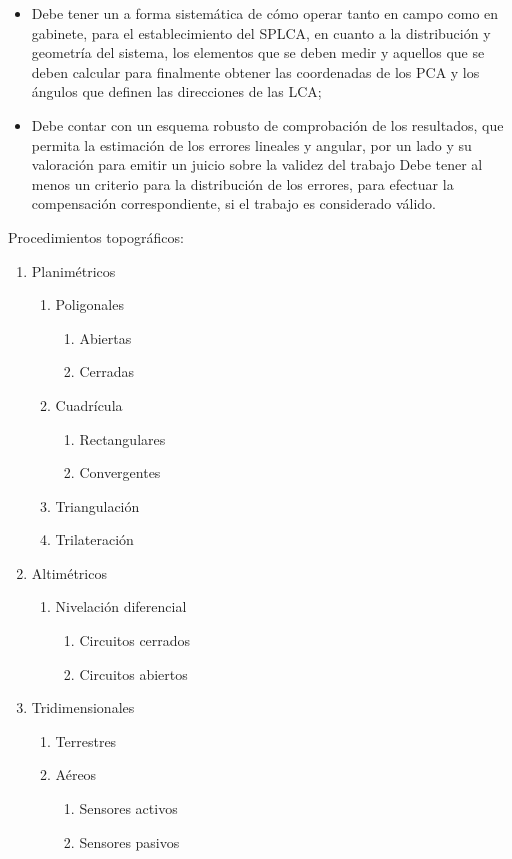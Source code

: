 \begin{itemize}
    \item Debe tener un a forma sistemática de cómo operar tanto en campo como en gabinete, para el establecimiento del SPLCA, en cuanto a la distribución y geometría del sistema, los elementos que se deben medir y aquellos que se deben calcular para finalmente obtener las coordenadas de los PCA y los ángulos que definen las direcciones de las LCA; 
    \item Debe contar con un esquema robusto de comprobación de los resultados, que permita la estimación de los errores lineales y angular, por un lado y su valoración para emitir un juicio sobre la validez del trabajo
    Debe tener al menos un criterio para la distribución de los errores, para efectuar la compensación correspondiente, si el trabajo es considerado válido.
\end{itemize}

Procedimientos topográficos: 

\begin{enumerate}
    \item Planimétricos
    \begin{enumerate}
        \item Poligonales
        \begin{enumerate}
            \item Abiertas
            \item Cerradas
        \end{enumerate}
        \item Cuadrícula
        \begin{enumerate}
            \item Rectangulares
            \item Convergentes
        \end{enumerate}
        \item Triangulación
        \item Trilateración
    \end{enumerate}
    \item Altimétricos
    \begin{enumerate}
        \item Nivelación diferencial
        \begin{enumerate}
            \item Circuitos cerrados
            \item Circuitos abiertos
        \end{enumerate}
    \end{enumerate}
    \item Tridimensionales
    \begin{enumerate}
        \item Terrestres
        \item Aéreos
        \begin{enumerate}
            \item Sensores activos
            \item Sensores pasivos
        \end{enumerate}
    \end{enumerate}
\end{enumerate}

